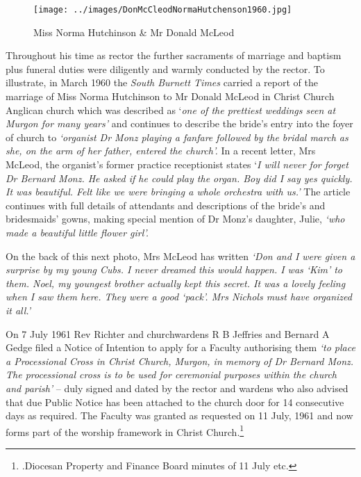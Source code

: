 \begin{figure}[!htb]
\begin{center}
\texttt{[image: ../images/DonMcCleodNormaHutchenson1960.jpg]}
\caption{Miss Norma Hutchinson \& Mr Donald McLeod}
\end{center}
\end{figure}




Throughout his time as rector the further sacraments of marriage and baptism plus funeral duties were diligently and warmly conducted by the rector. To illustrate, in March 1960 the \emph{South Burnett Times} carried a report of the marriage of Miss Norma Hutchinson to Mr Donald McLeod in Christ Church Anglican church which was described as `\emph{one of the prettiest weddings seen at Murgon for many years'} and continues to describe the bride's entry into the foyer of church to \emph{`organist Dr Monz playing a fanfare followed by the bridal march as she, on the arm of her father, entered the church'.} In a recent letter, Mrs McLeod, the organist's former practice receptionist states `\emph{I will never for forget Dr Bernard Monz. He asked if he could play the organ. Boy did I say yes quickly. It was beautiful. Felt like we were bringing a whole orchestra with us.'} The article continues with full details of attendants and descriptions of the bride's and bridesmaids' gowns, making special mention of Dr Monz's daughter, Julie, \emph{`who made a beautiful little flower girl'.}



On the back of this next photo, Mrs McLeod has written \emph{`Don and I were given a surprise by my young Cubs. I never dreamed this would happen. I was `Kim' to them. Noel, my youngest brother actually kept this secret. It was a lovely feeling when I saw them here. They were a good `pack'. Mrs Nichols must have organized it all.'}



On 7 July 1961 Rev Richter and churchwardens R B Jeffries and Bernard A Gedge filed a Notice of Intention to apply for a Faculty authorising them \emph{`to place a Processional Cross in Christ Church, Murgon, in memory of Dr Bernard Monz. The processional cross is to be used for ceremonial purposes within the church and parish'} -- duly signed and dated by the rector and wardens who also advised that due Public Notice has been attached to the church door for 14 consecutive days as required. The Faculty was granted as requested on 11 July, 1961 and now forms part of the worship framework in Christ Church.\footnote{.Diocesan Property and Finance Board minutes of 11 July etc.}


